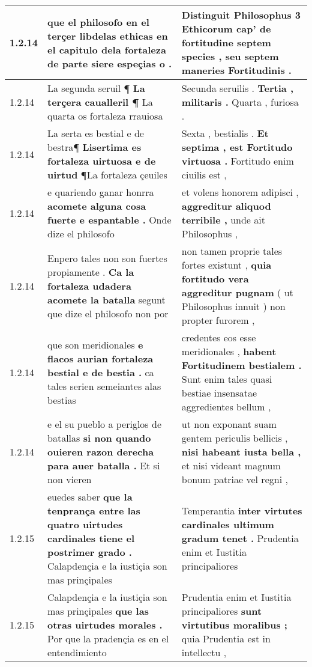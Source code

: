 \begin{tabular}{|p{1cm}|p{6.5cm}|p{6.5cm}|}
1.2.14 & que el philosofo en el terçer \textbf{ libdelas ethicas en el capitulo dela fortaleza } de parte siere espeçias o . & Distinguit Philosophus 3 Ethicorum cap’ \textbf{ de fortitudine septem species , } seu septem maneries Fortitudinis . \\\hline
1.2.14 & La segunda seruil ¶ \textbf{ La terçera caualleril ¶ } La quarta os fortaleza rrauiosa & Secunda seruilis . \textbf{ Tertia , militaris . } Quarta , furiosa . \\\hline
1.2.14 & La serta es bestial e de bestra¶ \textbf{ Lisertima es fortaleza uirtuosa e de uirtud } ¶La fortaleza çeuiles & Sexta , bestialis . \textbf{ Et septima , est Fortitudo virtuosa . } Fortitudo enim ciuilis est , \\\hline
1.2.14 & e quariendo ganar honrra \textbf{ acomete alguna cosa fuerte e espantable . } Onde dize el philosofo & et volens honorem adipisci , \textbf{ aggreditur aliquod terribile , } unde ait Philosophus , \\\hline
1.2.14 & Enpero tales non son fuertes propiamente . \textbf{ Ca la fortaleza udadera acomete la batalla } segunt que dize el philosofo non por & non tamen proprie tales fortes existunt , \textbf{ quia fortitudo vera aggreditur pugnam } ( ut Philosophus innuit ) non propter furorem , \\\hline
1.2.14 & que son meridionales \textbf{ e flacos aurian fortaleza bestial e de bestia . } ca tales serien semeiantes alas bestias & credentes eos esse meridionales , \textbf{ habent Fortitudinem bestialem . } Sunt enim tales quasi bestiae insensatae aggredientes bellum , \\\hline
1.2.14 & e el su pueblo a periglos de batallas \textbf{ si non quando ouieren razon derecha para auer batalla . } Et si non vieren & ut non exponant suam gentem periculis bellicis , \textbf{ nisi habeant iusta bella , } et nisi videant magnum bonum patriae vel regni , \\\hline
1.2.15 & euedes saber \textbf{ que la tenprança entre las quatro uirtudes cardinales tiene el postrimer grado . } Calapdençia e la iustiçia son mas prinçipales & Temperantia \textbf{ inter virtutes cardinales ultimum gradum tenet . } Prudentia enim et Iustitia principaliores \\\hline
1.2.15 & Calapdençia e la iustiçia son mas prinçipales \textbf{ que las otras uirtudes morales . } Por que la pradençia es en el entendimiento & Prudentia enim et Iustitia principaliores \textbf{ sunt virtutibus moralibus ; } quia Prudentia est in intellectu , \\\hline

\end{tabular}
